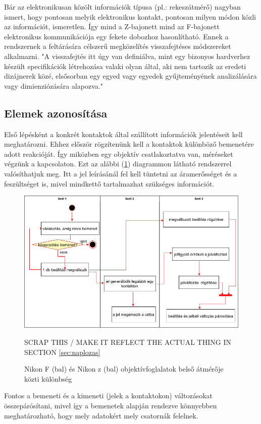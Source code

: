 Bár az elektronikusan közölt információk típusa (pl.: rekeszátmérő) nagyban ismert, hogy pontosan melyik elektronikus kontakt, pontosan milyen módon közli az információt, ismeretlen. Így mind a Z-bajonett mind az F-bajonett elektronikus kommunikációja egy fekete dobozhoz hasonlítható. Ennek a rendszernek a feltárására célszerű megközelítés visszafejtéses módszereket alkalmazni. "A visszafejtés itt úgy van definiálva, mint egy bizonyos hardverhez készült specifikációk létrehozása valaki olyan által, aki nem tartozik az eredeti dizájnerek közé, elsősorban egy egyed vagy egyedek gyűjteményének analizálására vagy dimienziózására alapozva."\cite{Reverse_engineering}
\subsection{Elemek azonosítása}
Első lépésként a konkrét kontaktok által szállított információk jelentéseit kell meghatározni. Ehhez először rögzítenünk kell a kontaktok különböző bemenetére adott reakcióját. Így miközben egy objektív csatlakoztatva van, méréseket végzünk a kapcsolaton. Ezt az alábbi (\ref{fig:jelparosito_UML}) diagrammon látható rendszerrel valósíthatjuk meg. Itt a jel leírásánál fel kell tüntetni az áramerősséget és a feszültséget is, mivel mindkettő tartalmazhat szükséges információt.
\begin{figure}[H]
	\centering
	\includegraphics[width=1.0\linewidth]{img/Reverse_2.drawio.png}
	\caption{Nikon F (bal) és Nikon z (bal) objektívfoglalatok belső átmérője közti különbség}
	SCRAP THIS / MAKE IT REFLECT THE ACTUAL THING IN SECTION \ref{sec:naplozas}
	\label{fig:jelparosito_UML}
\end{figure}
Fontos a bemeneti és a kimeneti (jelek a kontaktokon) változásokat összepárósítani, mivel így a bemenetek alapján rendezve könnyebben meghatározható, hogy mely adatokért mely csatornák felelnek.
